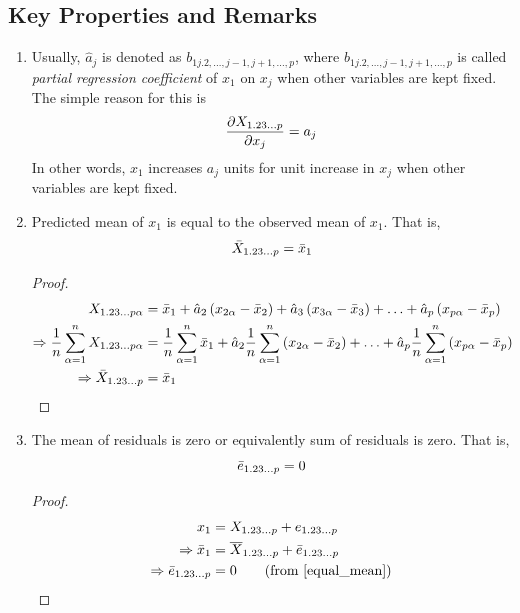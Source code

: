 \documentclass[10pt]{article}
\begin{document}
\subsection{Key Properties and Remarks}
\begin{enumerate}[1.]
	\item Usually, $ \hat{a}_j $ is denoted as $ b_{1j.2,\dots,j-1, j+1, \dots, p} $, where $ b_{1j.2,\dots,j-1, j+1, \dots, p} $ is called \textit{partial regression coefficient} of $ x_1 $ on $ x_j $ when other variables are kept fixed.
		The simple reason for this is 
\[ \frac{\partial X_{1.23\dots p}}{\partial x_j} = a_j\] 
In other words, $ x_1 $ increases $ a_j $ units for unit increase in $ x_j $ when other variables are kept fixed.

        \item Predicted mean of $ x_1 $ is equal to the observed mean of $ x_1 $. That is,
		\begin{equation}
			\bar{X}_{1.23\dots p} = \bar{x}_1 \label{equal_mean}
		\end{equation}
	\begin{proof}
	    \begin{align*}
		    X_{1.23\dots p\alpha} &= \bar{x}_1 + \hat{a}_2 \left( x_{2\alpha} - \bar{x}_2 \right) + \hat{a}_3 \left( x_{3\alpha} - \bar{x}_3 \right) + \ldots + \hat{a}_p \left( x_{p\alpha} - \bar{x}_p \right) \notag \\
		    \Rightarrow \frac{ 1 }{ n } \sum_{\alpha = 1}^{n}		    X_{1.23\dots p\alpha} &= \frac{ 1 }{ n } \sum_{\alpha = 1}^{n}	\bar{x}_1 + \hat{a}_2 \frac{ 1 }{ n } \sum_{\alpha = 1}^{n}	\left( x_{2\alpha} - \bar{x}_2 \right) + \ldots + \hat{a}_p \frac{ 1 }{ n } \sum_{\alpha = 1}^{n}	\left( x_{p\alpha} - \bar{x}_p \right) \notag \\
		    \Rightarrow \bar{X}_{1.23\dots p} &= \bar{x}_1 
	    \end{align*}
	\end{proof}

	\item The mean of residuals is zero or equivalently sum of residuals is zero. That is,
		\begin{equation}
			\bar{e}_{1.23\dots p} = 0 \label{zero_resid_mean}
		\end{equation} 
	\begin{proof}
	    \begin{align}
	        x_{1} &= X_{\regsub} + e_{\regsub} \notag \\
		\implies \bar{x}_{1} &= \overline{X}_{\regsub} + \bar{e}_{\regsub} \notag \\
		\implies \bar{e}_{\regsub} &= 0 \tag*{(from \eqref{equal_mean})}
		\end{align}
	\end{proof}
\end{enumerate}
\end{document}
